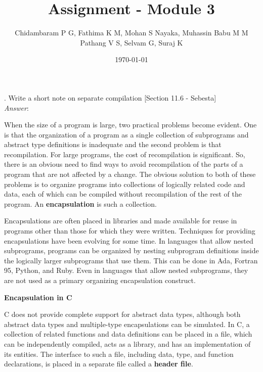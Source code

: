 \documentclass[a4paper,12pt]{article}
\begin{document}
\title{Assignment - Module 3}
\date{\today}
\author{Chidambaram P G, Fathima K M, Mohan S Nayaka, Muhassin Babu M M\\ Pathang V S, Selvam G, Suraj K}
\maketitle
{}. Write a short note on separate compilation [Section 11.6 - Sebesta]\\
\emph{Answer}:

When the size of a program is large, two practical problems become evident. One is that the organization of a program as a single collection of subprograms and abstract type definitions is inadequate and the second problem is that recompilation. For large programs, the cost of recompilation is significant. So, there is an obvious need to find ways to avoid recompilation of the parts of a program that are not affected by a change. The obvious solution to both of these problems is to organize programs into collections of logically related code and data, each of which can be compiled without recompilation of the rest of the program. An \textbf{encapsulation} is such a collection.

Encapsulations are often placed in libraries and made available for reuse in programs other than those for which they were written. Techniques for providing encapsulations have been evolving for some time. In languages that allow nested subprograms, programs can be organized by nesting subprogram definitions inside the logically larger subprograms that use them. This can be done in Ada, Fortran 95, Python, and Ruby. Even in languages that allow nested subprograms, they are not used as a primary organizing encapsulation construct.

\textbf{Encapsulation in C}

C does not provide complete support for abstract data types, although both abstract data types and multiple-type encapsulations can be simulated. In C, a collection of related functions and data definitions can be placed in a file, which can be independently compiled, acts as a library, and has an implementation of its entities. The interface to such a file, including data, type, and function declarations, is placed in a separate file called a \textbf{header file}.
\end{document}
